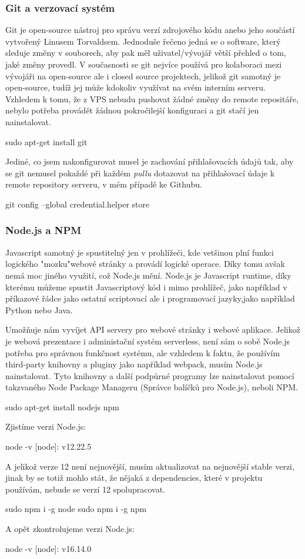 \documentclass[12pt,a4paper]{report}
\begin{document}
  \subsubsection{Git a verzovací systém}
  Git je open-source nástroj pro správu verzí zdrojového kódu anebo jeho součástí vytvořený Linusem Torvaldsem. Jednoduše řečeno jedná se o software, který sleduje změny v souborech, aby pak měl uživatel/vývojář 
  větší přehled o tom, jaké změny provedl. V současnosti se git nejvíce používá pro kolaboraci mezi vývojáři na open-source ale i closed source projektech, jelikož git samotný je open-source, tudíž jej může kdokoliv využívat na svém interním serveru.
  Vzhledem k tomu, že z VPS nebudu pushovat žádné změny do remote repositáře, nebylo potřeba provádět žádnou pokročilejší konfiguraci a git stačí jen nainstalovat.
  \begin{bash}
    sudo apt-get install git
  \end{bash}
  Jediné, co jsem nakonfigurovat musel je zachování přihlašovacích údajů tak, aby se git nemusel pokaždé při každém \emph{pullu} dotazovat na přihlašovací údaje k remote repository serveru, v mém případě ke Githubu.
  \begin{bash}
    git config --global credential.helper store
  \end{bash}
  \subsubsection{Node.js a NPM}
  Javascript samotný je spustitelný jen v prohlížeči, kde vetšinou plní funkci logického "mozku"\space webové stránky a provádí logické operace. Díky tomu avšak nemá moc jiného využití, což Node.js mění.
  Node.js je Javascript runtime, díky kterému můžeme spustit Javascriptový kód i mimo prohlížeč, jako například v příkazové řádce jako ostatní scriptovací ale i programovací jazyky,jako například Python nebo Java.
 
  Umožňuje nám vyvíjet API servery pro webové stránky i webové aplikace. 
  Jelikož je webová prezentace i administační systém serverless, není sám o sobě Node.js potřeba pro správnou funkčnost systému, ale vzhledem k faktu, že
  používím third-party knihovny a pluginy jako například webpack, musím Node.js nainstalovat. Tyto knihovny a další podpůrné programy lze nainstalovat pomocí takzvaného Node Package Manageru (Správce balíčků pro Node.js), neboli NPM.
  \begin{bash}
    sudo apt-get install nodejs npm
  \end{bash}
  Zjistíme verzi Node.js:
  \begin{bash}
    node -v
    [node]: v12.22.5
  \end{bash}
  \clearpage
  A jelikož verze 12 není nejnovější, musím aktualizovat na nejnovější stable verzi, jinak by se totiž mohlo stát, že nějaká z dependencies, které v projektu používám, nebude se verzí 12 spolupracovat.
  \begin{bash}
    sudo npm i -g node
    sudo npm i -g npm
  \end{bash}
  A opět zkontrolujeme verzi Node.js:
  \begin{bash}
    node -v
    [node]: v16.14.0
  \end{bash}
\end{document}
